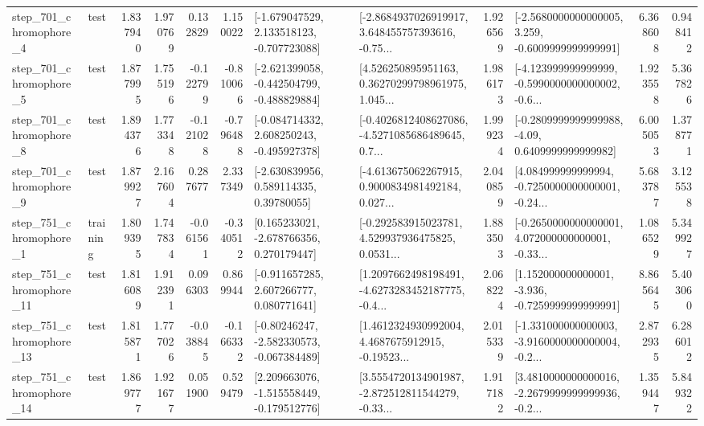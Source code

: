 \begin{tabular}{llrrrrllrlrr}
   step\_701\_chromophore\_4 &      test &      1.837940 &    1.970769 &      0.132829 &  1.150022 &   [-1.679047529, 2.133518123, -0.707723088] &  [-2.8684937026919917, 3.648455757393616, -0.75... &       1.926569 &  [-2.5680000000000005, 3.259, -0.6009999999999991] &            6.368608 &          0.948412 \\
   step\_701\_chromophore\_5 &      test &      1.877995 &    1.755196 &     -0.122799 & -0.810066 &  [-2.621399058, -0.442504799, -0.488829884] &  [4.526250895951163, 0.36270299798961975, 1.045... &       1.986173 &  [-4.123999999999999, -0.5990000000000002, -0.6... &            1.923558 &          5.367826 \\
   step\_701\_chromophore\_8 &      test &      1.894376 &    1.773348 &     -0.121028 & -0.796488 &   [-0.084714332, 2.608250243, -0.495927378] &  [-0.4026812408627086, -4.5271085686489645, 0.7... &       1.999234 &   [-0.2809999999999988, -4.09, 0.6409999999999982] &            6.005053 &          1.378771 \\
   step\_701\_chromophore\_9 &      test &      1.879927 &    2.167604 &      0.287677 &  2.337349 &     [-2.630839956, 0.589114335, 0.39780055] &  [-4.613675062267915, 0.9000834981492184, 0.027... &       2.040859 &  [4.084999999999994, -0.7250000000000001, -0.24... &            5.683787 &          3.125538 \\
   step\_751\_chromophore\_1 &  training &      1.809395 &    1.747834 &     -0.061561 & -0.340512 &    [0.165233021, -2.678766356, 0.270179447] &  [-0.292583915023781, 4.529937936475825, 0.0531... &       1.883503 &  [-0.2650000000000001, 4.072000000000001, -0.33... &            1.086529 &          5.349927 \\
  step\_751\_chromophore\_11 &      test &      1.816089 &    1.912391 &      0.096303 &  0.869944 &    [-0.911657285, 2.607266777, 0.080771641] &  [1.2097662498198491, -4.6273283452187775, -0.4... &       2.068224 &   [1.152000000000001, -3.936, -0.7259999999999991] &            8.865645 &          5.403060 \\
  step\_751\_chromophore\_13 &      test &      1.815871 &    1.777026 &     -0.038845 & -0.166332 &   [-0.80246247, -2.582330573, -0.067384489] &  [1.4612324930992004, 4.4687675912915, -0.19523... &       2.015339 &  [-1.331000000000003, -3.9160000000000004, -0.2... &            2.872935 &          6.286012 \\
  step\_751\_chromophore\_14 &      test &      1.869777 &    1.921677 &      0.051900 &  0.529479 &   [2.209663076, -1.515558449, -0.179512776] &  [3.5554720134901987, -2.872512811544279, -0.33... &       1.917182 &  [3.4810000000000016, -2.2679999999999936, -0.2... &            1.359447 &          5.849322 \\

\end{tabular}
